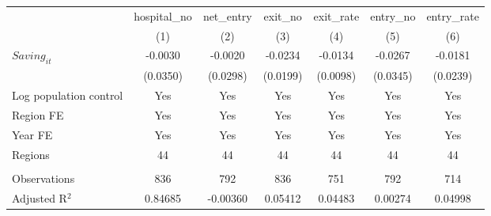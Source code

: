 \begingroup
\centering
\begin{tabular}{lcccccc}
   \toprule
                          & hospital\_no  & net\_entry  & exit\_no  & exit\_rate  & entry\_no  & entry\_rate \\    
                          & (1)           & (2)         & (3)       & (4)         & (5)        & (6)\\  
   \midrule 
   $Saving_{it}$          & -0.0030       & -0.0020     & -0.0234   & -0.0134     & -0.0267    & -0.0181\\   
                          & (0.0350)      & (0.0298)    & (0.0199)  & (0.0098)    & (0.0345)   & (0.0239)\\   
   Log population control & Yes           & Yes         & Yes       & Yes         & Yes        & Yes\\  
   Region FE              & Yes           & Yes         & Yes       & Yes         & Yes        & Yes\\  
   Year FE                & Yes           & Yes         & Yes       & Yes         & Yes        & Yes\\  
   Regions                & 44            & 44          & 44        & 44          & 44         & 44\\  
    \\
   Observations           & 836           & 792         & 836       & 751         & 792        & 714\\  
   Adjusted R$^2$         & 0.84685       & -0.00360    & 0.05412   & 0.04483     & 0.00274    & 0.04998\\  
   \bottomrule
\end{tabular}
\par\endgroup
